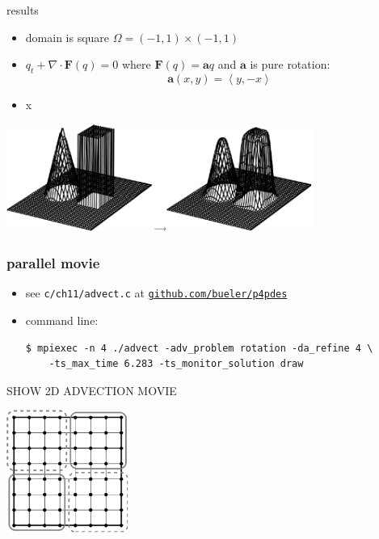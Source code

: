 \documentclass[10pt,hyperref,dvipsnames]{beamer}
\newcommand{\ba}{\mathbf{a}}
\newcommand{\bF}{\mathbf{F}}
\newcommand{\Div}{\nabla\cdot}
\begin{document}
\begin{frame}{results}

\begin{itemize}
\item domain is square $\Omega = (-1,1) \times (-1,1)$
\item $q_t + \Div \bF(q) = 0$ where $\bF(q) = \ba q$ and $\ba$ is pure rotation:
    $$\ba(x,y) = \left<y,-x\right>$$
\item x
\end{itemize}

\hfill \includegraphics[width=0.75\textwidth]{figs/bueler11p7}
\end{frame}


\begin{frame}[fragile]
\frametitle{parallel movie}

\begin{itemize}
\item see \texttt{c/ch11/advect.c} at \href{https://github.com/bueler/p4pdes}{\texttt{github.com/bueler/p4pdes}}
\item command line:
\begin{Verbatim}[fontsize=\small]
$ mpiexec -n 4 ./advect -adv_problem rotation -da_refine 4 \
    -ts_max_time 6.283 -ts_monitor_solution draw
\end{Verbatim}
\end{itemize}

\vspace{10mm}
\hspace{15mm} \alert{SHOW 2D ADVECTION MOVIE}

\vspace{-10mm}
\hfill \includegraphics[width=0.3\textwidth]{figs/buelerfourproc}
\end{frame}
\end{document}
